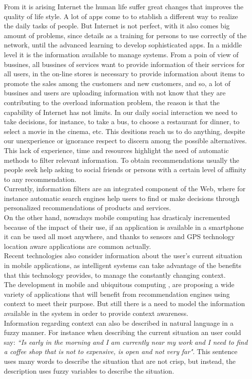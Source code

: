From it is arising Internet the human life suffer great changes
that improves the quality of life style. A lot of apps come to 
to stablish a different way to realize the daily tasks of people.
But Internet is not perfect, with it also comes big amount of problems, 
since details as
a training for persons to use correctly of the network, until the
advanced learning to develop sophisticated apps. In a middle level
it is the information available to manage systems. 
From a poin of view of bussines, all bussines of services want 
to provide information of their services for all users, 
in the on-line stores is necessary to provide information about 
items to promote the sales among the customers 
and new customers, and so, a lot of bussines and users are uploading 
information with not know that they are contributing to 
the overload information problem, 
the reason is that the capability of Internet has not limits.
In our daily social interaction we need to take decisions, 
for instance, to take a bus, to choose a restaurant for dinner,
to select a movie in the cinema, etc. This desitions reach us to 
do anything,  despite our unexperience or ignorance respect to
discern among the possible alternatives.
This lack of experience, time and resources 
highlight the need of automatic methods 
to filter relevant information.
To obtain recommendations usually the people seek help 
asking to social friends or persons with a certain 
level of affinity to any recommendation.\\
Currently, information filters are
an integrated component of the Web, where for instance
automatic search engines help users to find or make 
decisions through personalized recommendations
of products and services. \\ 
On the other hand, nowadays mobile computing has drasticaly 
incremented because of the impact of their use, if an application 
is available in a smartphone it can be used all most anywhere, 
and thanks to sensors and GPS technology location aware 
applications are common actually.\\ 
Recent technologies also consider information about the user's 
current situation in mobile applications, as intelligent systems 
can take advantage of the benefits that this technology provides, 
to manage the constantly changing context. \\ 
The development in mobile and ubiquitous computing \cite{noguera2012mobile} 
\cite{chiou2010adaptive}, are proposing a wide variety of applications
that will benefit from recommendation engines using context to meet their
purpose. But still there is a need to model the information available in
the system in order to provide context awareness.\\  Information regarding 
context can also be described in natural language in a fuzzy manner. For
instance when describing the current situation an user could say:
\textit{``Is early in
the morning and I am currently near my work and I need to find a coffee
shop that is not to expensive, is open and not very far"}.
This sentence uses many words to describe the situation that are not 
crisp, but instead, the description uses fuzzy variables to 
describe the situation.  

